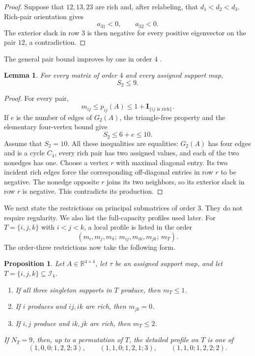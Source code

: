 \documentclass[11pt,a4paper]{article}
\newtheorem{proposition}[theorem]{Proposition}
\newtheorem{lemma}[theorem]{Lemma}
\theoremstyle{definition}
\newcommand{\R}{\mathbb R}
\newcommand{\Ind}{\mathcal I}
\newcommand{\indic}{\mathbf I}
\begin{document}
\begin{proof}
Suppose that $12,13,23$ are rich and, after relabeling, that
$d_1<d_2<d_3$. Rich-pair orientation gives
$$
a_{31}<0,
\qquad
a_{32}<0.
$$
The exterior slack in row $3$ is then negative for every positive
eigenvector on the pair $12$, a contradiction.
\end{proof}

The general pair bound improves by one in order $4$ .

\begin{lemma}
\label{lem:S2-bound}
For every matrix of order $4$  and every assigned support map,
$$
S_2\leq9.
$$
\end{lemma}

\begin{proof}
For every pair,
$$
m_{ij}\leq p_{ij}(A)
\leq1+\indic_{\{ij\text{ is rich}\}}.
$$
If $e$ is the number of edges of $G_2(A)$, the triangle-free property
and the elementary four-vertex bound give
$$
S_2\leq6+e\leq10.
$$
Assume that $S_2=10$. All these inequalities are equalities:
$G_2(A)$ has four edges and is a cycle $C_4$, every rich pair has two
assigned values, and each of the two nonedges has one. Choose a vertex
$r$ with maximal diagonal entry. Its two incident rich edges force the
corresponding off-diagonal entries in row $r$ to be negative. The
nonedge opposite $r$ joins its two neighbors, so its exterior slack in
row $r$ is negative. This contradicts its production.
\end{proof}

We next state the restrictions on principal submatrices of order $3$.
They do not require regularity. We also list the full-capacity profiles
used later.
For $T=\{i,j,k\}$ with $i<j<k$, a local profile is listed in the order
$$
(m_i,m_j,m_k;\,m_{ij},m_{ik},m_{jk};\,m_T).
$$
The order-three restrictions now take the following form.

\begin{proposition}
\label{prop:order-three-restrictions}
Let $A\in\R^{4\times4}$, let $\tau$ be an assigned support map, and let
$T=\{i,j,k\}\subseteq\Ind_4$.

\begin{enumerate}[label=\textup{(\roman*)}]
\item If all three singleton supports in $T$ produce, then $m_T\leq1$.
\item If $i$ produces and $ij,ik$ are rich, then $m_{jk}=0$.
\item If $i,j$ produce and $ik,jk$ are rich, then $m_T\leq2$.
\end{enumerate}

If $N_T=9$, then, up to a permutation of $T$, the detailed profile on
$T$ is one of
$$
(1,0,0;1,2,2;3),
\qquad
(1,1,0;1,2,1;3),
\qquad
(1,1,0;1,2,2;2).
$$
\end{proposition}
\end{document}
